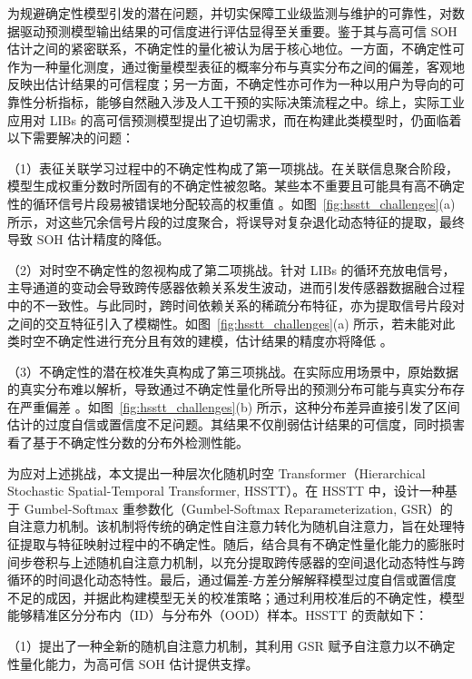 \documentclass[UTF8,journal,twoside,web]{ieeecolor}
\begin{document}
为规避确定性模型引发的潜在问题，并切实保障工业级监测与维护的可靠性，对数据驱动预测模型输出结果的可信度进行评估显得至关重要。鉴于其与高可信 SOH 估计之间的紧密联系，不确定性的量化被认为居于核心地位\cite{THUY2024330, 10539360}。一方面，不确定性可作为一种量化测度，通过衡量模型表征的概率分布与真实分布之间的偏差，客观地反映出估计结果的可信程度；另一方面，不确定性亦可作为一种以用户为导向的可靠性分析指标，能够自然融入涉及人工干预的实际决策流程之中。综上，实际工业应用对 LIBs 的高可信预测模型提出了迫切需求，而在构建此类模型时，仍面临着以下需要解决的问题：

（1）表征关联学习过程中的不确定性构成了第一项挑战。在关联信息聚合阶段，模型生成权重分数时所固有的不确定性被忽略。某些本不重要且可能具有高不确定性的循环信号片段易被错误地分配较高的权重值 \cite{20222012122312, 20191806851746, 10342686}。如图~\ref{fig:hsstt_challenges}(a) 所示，对这些冗余信号片段的过度聚合，将误导对复杂退化动态特征的提取，最终导致 SOH 估计精度的降低。

（2）对时空不确定性的忽视构成了第二项挑战。针对 LIBs 的循环充放电信号，主导通道的变动会导致跨传感器依赖关系发生波动，进而引发传感器数据融合过程中的不一致性。与此同时，跨时间依赖关系的稀疏分布特征，亦为提取信号片段对之间的交互特征引入了模糊性。如图~\ref{fig:hsstt_challenges}(a) 所示，若未能对此类时空不确定性进行充分且有效的建模，估计结果的精度亦将降低 \cite{wang2023inherent, 9729404, capsnet_rul_li2024sensor}。

（3）不确定性的潜在校准失真构成了第三项挑战。在实际应用场景中，原始数据的真实分布难以解析，导致通过不确定性量化所导出的预测分布可能与真实分布存在严重偏差 \cite{kuleshov2018accurate, 9729404, 10217044}。如图~\ref{fig:hsstt_challenges}(b) 所示，这种分布差异直接引发了区间估计的过度自信或置信度不足问题。其结果不仅削弱估计结果的可信度，同时损害看了基于不确定性分数的分布外检测性能。

为应对上述挑战，本文提出一种层次化随机时空 Transformer（Hierarchical Stochastic Spatial-Temporal Transformer, HSSTT）。在 HSSTT 中，设计一种基于 Gumbel-Softmax 重参数化（Gumbel-Softmax Reparameterization, GSR）的自注意力机制。该机制将传统的确定性自注意力转化为随机自注意力，旨在处理特征提取与特征映射过程中的不确定性。随后，结合具有不确定性量化能力的膨胀时间步卷积与上述随机自注意力机制，以充分提取跨传感器的空间退化动态特性与跨循环的时间退化动态特性。最后，通过偏差-方差分解解释模型过度自信或置信度不足的成因，并据此构建模型无关的校准策略；通过利用校准后的不确定性，模型能够精准区分分布内（ID）与分布外（OOD）样本。HSSTT 的贡献如下：

（1）提出了一种全新的随机自注意力机制，其利用 GSR 赋予自注意力以不确定性量化能力，为高可信 SOH 估计提供支撑。
\end{document}
